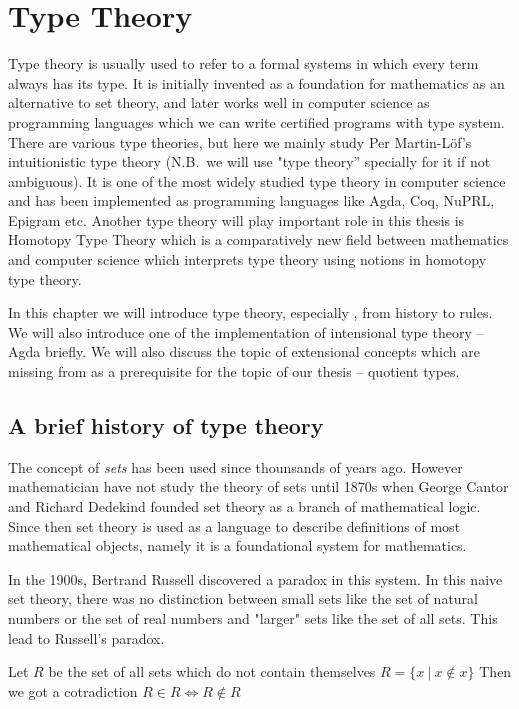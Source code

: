 \chapter{Type Theory}
\label{bg}

Type theory is usually used to refer to a formal systems in which every term always has its type. It is initially invented as a foundation for mathematics as an alternative to set theory, and later works well in computer science as programming languages which we can write certified programs with type system. There are various type theories, but here we mainly study Per Martin-L\"{o}f's intuitionistic type theory (N.B.\ we will use "type theory'' specially for it if not ambiguous). It is one of the most widely studied type theory in computer science and has been implemented as programming languages like Agda, Coq, NuPRL, Epigram etc. Another type theory will play important role in this thesis is Homotopy Type Theory which is a comparatively new field between mathematics and computer science which interprets type theory using notions in homotopy type theory.

In this chapter we will introduce type theory, especially \itt, from history to rules. We will also introduce one of the implementation of intensional type theory -- Agda briefly. We will also discuss the topic of extensional concepts which are missing from \itt as a prerequisite for the topic of our thesis -- quotient types.



\section{A brief history of type theory}

The concept of \emph{sets} has been used since thounsands of years ago. However mathematician have not study the theory of sets until 1870s when George Cantor and Richard Dedekind founded set theory as a branch of mathematical logic. Since then set theory is used as a language to describe definitions of most mathematical objects, namely it is a foundational system for mathematics.

In the 1900s, Bertrand Russell discovered a paradox in this system. In this naive set theory, there was no distinction between small sets like the set of natural numbers or the set of real numbers and "larger" sets like the set of all sets. This lead to Russell's paradox.

\begin{example}
Let $R$ be the set of all sets which do not contain themselves
$R = \{x ~| ~x \not\in  x\}$
Then we got a cotradiction
$R \in R \iff R \not\in R$
\end{example}

